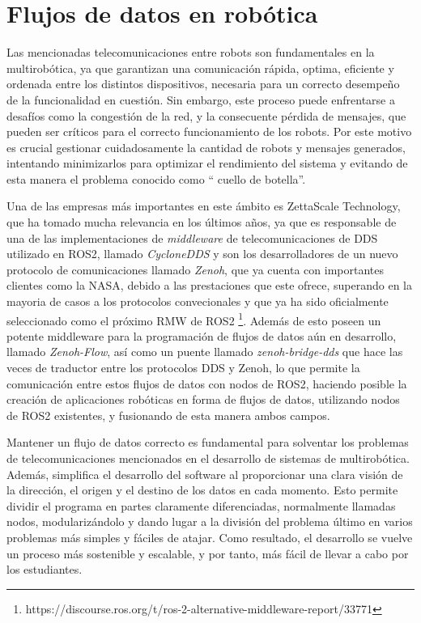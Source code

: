 \section{Flujos de datos en robótica}
\label{sec:flujos_datos} %

Las mencionadas telecomunicaciones entre robots son fundamentales en la
multirobótica, ya que garantizan una comunicación rápida, optima, eficiente y
ordenada entre los distintos dispositivos, necesaria para un correcto desempeño
de la funcionalidad en cuestión.
Sin embargo, este proceso puede enfrentarse a desafíos como la congestión de la
red, y la consecuente pérdida de mensajes, que pueden ser críticos para el
correcto funcionamiento de los robots.
Por este motivo es crucial gestionar cuidadosamente la cantidad de robots y
mensajes generados, intentando minimizarlos para optimizar el rendimiento del
sistema y evitando de esta manera el problema conocido como \textquotedblleft
cuello de botella\textquotedblright.

Una de las empresas más importantes en este ámbito es ZettaScale Technology, que
ha tomado mucha relevancia en los últimos años, ya que es responsable de una de
las implementaciones de \textit{middleware} de telecomunicaciones de DDS
utilizado en ROS2, llamado \textit{CycloneDDS} y son los desarrolladores de un
nuevo protocolo de comunicaciones llamado \textit{Zenoh}, que ya cuenta con
importantes clientes como la NASA, debido a las prestaciones que este ofrece,
superando en la mayoria de casos a los protocolos convecionales y que ya ha sido
oficialmente seleccionado como el próximo RMW de ROS2
\footnote{https://discourse.ros.org/t/ros-2-alternative-middleware-report/33771}.
Además de esto poseen un potente middleware para la programación de flujos de
datos aún en desarrollo, llamado \textit{Zenoh-Flow}, así como un puente llamado
\textit{zenoh-bridge-dds} que hace las veces de traductor entre los protocolos
DDS y Zenoh, lo que permite la comunicación entre estos flujos de datos con
nodos de ROS2, haciendo posible la creación de aplicaciones robóticas en forma
de flujos de datos, utilizando nodos de ROS2 existentes, y fusionando de esta
manera ambos campos.

Mantener un flujo de datos correcto es fundamental para solventar los problemas
de telecomunicaciones mencionados en el desarrollo de sistemas de multirobótica.
Además, simplifica el desarrollo del software al proporcionar una clara visión
de la dirección, el origen y el destino de los datos en cada momento.
Esto permite dividir el programa en partes claramente diferenciadas, normalmente
llamadas nodos, modularizándolo y dando lugar a la división del problema último
en varios problemas más simples y fáciles de atajar.
Como resultado, el desarrollo se vuelve un proceso más sostenible y escalable, y
por tanto, más fácil de llevar a cabo por los estudiantes.

